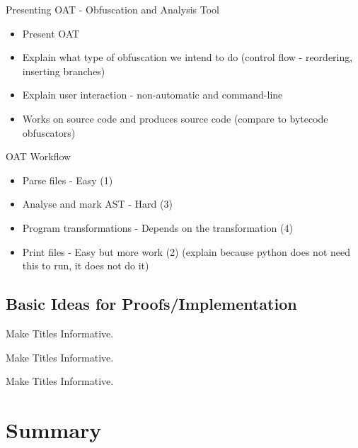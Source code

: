 \begin{frame}{Presenting OAT - Obfuscation and Analysis Tool}
\begin{itemize}
\item Present OAT
\item Explain what type of obfuscation we intend to do (control flow - reordering, inserting branches)
\item Explain user interaction - non-automatic and command-line
\item Works on source code and produces source code (compare to bytecode obfuscators)
\end{itemize}
\end{frame}

\begin{frame}{OAT Workflow}
\begin{itemize}
\item Parse files - Easy (1)
\item Analyse and mark AST - Hard (3)
\item Program transformations - Depends on the transformation (4)
\item Print files - Easy but more work (2) (explain because python does not need this to run, it does not do it)
\end{itemize}
\end{frame}

\subsection{Basic Ideas for Proofs/Implementation}

\begin{frame}{Make Titles Informative.}
\end{frame}

\begin{frame}{Make Titles Informative.}
\end{frame}

\begin{frame}{Make Titles Informative.}
\end{frame}



\section*{Summary}


